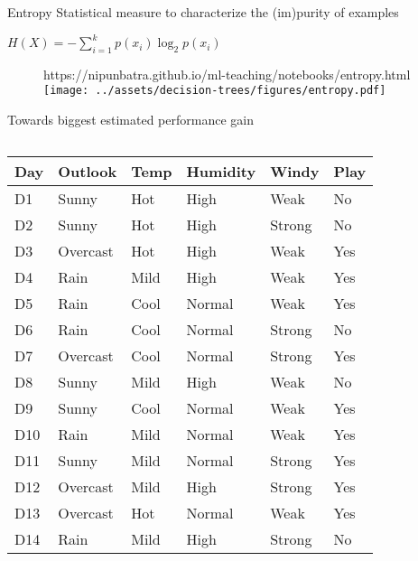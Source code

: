 \documentclass[usenames,dvipsnames]{beamer}
\begin{document}
\begin{frame}{Entropy}
 Statistical measure to characterize the
(im)purity of examples

\pause $H(X) = -\sum_{i=1}^k p(x_i) \log_2 p(x_i)$

\begin{figure}[htp]
    \centering
    \begin{notebookbox}{https://nipunbatra.github.io/ml-teaching/notebooks/entropy.html}
      \texttt{[image: ../assets/decision-trees/figures/entropy.pdf]}
    \end{notebookbox}
  \end{figure}

\end{frame}
	
\begin{frame}{Towards biggest estimated performance gain}
\begin{columns}[T,onlytextwidth]
    \begin{column}{.7\textwidth}
        \begin{scriptsize}
            \begin{tabular}{lllll||l} \toprule
                \textbf{Day} & \textbf{Outlook}  & \textbf{Temp} & \textbf{Humidity} & \textbf{Windy}  & \textbf{Play} \\ \midrule
                D1  & Sunny    & Hot  & High     & Weak   & No   \\
                D2  & Sunny    & Hot  & High     & Strong & No   \\
                D3  & Overcast & Hot  & High     & Weak   & Yes  \\
                D4  & Rain     & Mild & High     & Weak   & Yes  \\
                D5  & Rain     & Cool & Normal   & Weak   & Yes  \\
                D6  & Rain     & Cool & Normal   & Strong & No   \\
                D7  & Overcast & Cool & Normal   & Strong & Yes  \\
                D8  & Sunny    & Mild & High     & Weak   & No   \\
                D9  & Sunny    & Cool & Normal   & Weak   & Yes  \\
                D10 & Rain     & Mild & Normal   & Weak   & Yes  \\
                D11 & Sunny    & Mild & Normal   & Strong & Yes  \\
                D12 & Overcast & Mild & High     & Strong & Yes  \\
                D13 & Overcast & Hot  & Normal   & Weak   & Yes  \\
                D14 & Rain     & Mild & High     & Strong & No  \\ \bottomrule
            \end{tabular}
        \end{scriptsize}
    \end{column}


\end{columns}
\end{frame}
\end{document}
